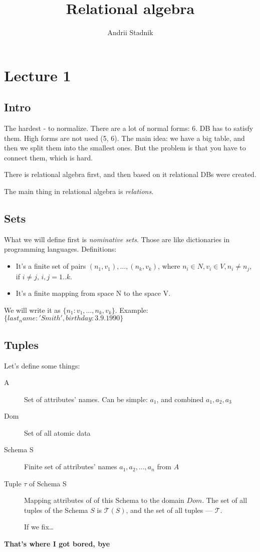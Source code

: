 \documentclass[a4paper]{article}
\title{Relational algebra}
\author{Andrii Stadnik}
\begin{document}
	\maketitle
	\tableofcontents
	\section{Lecture 1}
	\subsection{Intro}

	The hardest - to normalize. There are a lot of normal forms: 6. DB has to
	satisfy them. High forms are not used (5, 6). The main idea: we have a big
	table, and then we split them into the smallest ones. But the problem is
	that you have to connect them, which is hard.

	There is relational algebra first, and then based on it relational DBs were
	created.

	The main thing in relational algebra is \emph{relations}.

	\subsection{Sets}

	What we will define first is \emph{nominative sets}. Those are like
	dictionaries in programming languages.
	Definitions:
	\begin{itemize}
		\item It's a finite set of pairs ${(n_1, v_1), \ldots, (n_k, v_k)}$,
			where $n_i \in N, v_i \in V, n_i \neq n_j$, if $i \neq j$, $i, j =
			1..k $.
		\item It's a finite mapping from space N to the space V.
	\end{itemize}
	We will write it as $\{n_1: v_1, \ldots, n_k, v_k\}$.
	Example: $\{last_name:'Smith', birthday:3.9.1990\}$
	\subsection{Tuples}
	Let's define some things:
	\begin{description}
		\item[A] Set of attributes' names. Can be simple: $a_1$, and combined
			$a_1, a_2, a_3$
		\item[Dom] Set of all atomic data
		\item[Schema S] Finite set of attributes' names ${a_1, a_2, \ldots,
			a_n}$ from $A$
		\item[Tuple $\tau$ of Schema S] Mapping attributes of of this Schema to
			the domain $Dom$. The set of all tuples of the Schema $S$ is
			$\mathcal{T} (S)$, and the set of all tuples --- $\mathcal{T}$.

			If we fix\ldots
	\end{description}
	\textbf{That's where I got bored, bye}
	
\end{document}
